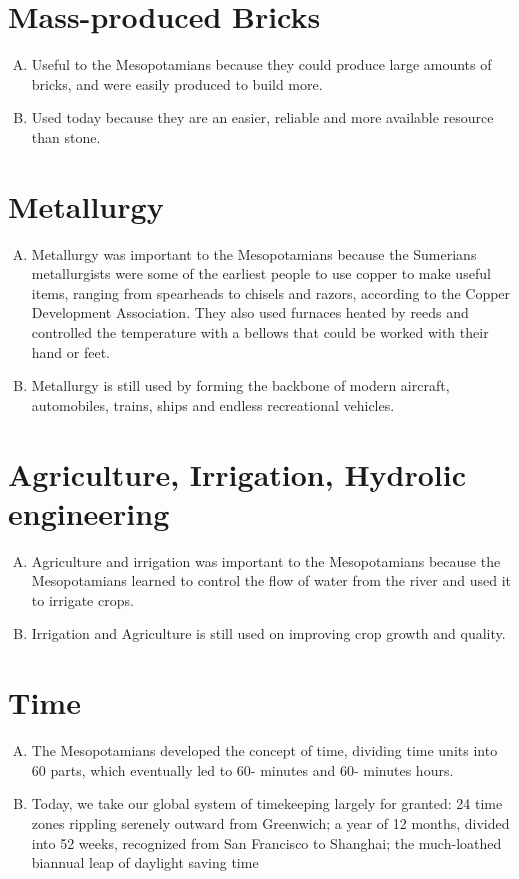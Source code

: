 \documentclass[12pt]{article}
\begin{document}
\section{Mass-produced Bricks}
\begin{enumerate}[A.]
    \item{Useful to the Mesopotamians because they could produce large amounts
        of bricks, and were easily produced to build more.}
    \item{Used today because they are an easier, reliable and more available
        resource than stone.}
\end{enumerate}

\section{Metallurgy}
\begin{enumerate}[A.]
    \item{Metallurgy was important to the Mesopotamians because the Sumerians
        metallurgists were some of the earliest people to use copper to make
        useful items, ranging from spearheads to chisels and razors, according to
        the Copper Development Association. They also used furnaces heated by reeds and
        controlled the temperature with a bellows that could be worked with their hand
        or feet.}
    \item{Metallurgy is still used by forming the backbone of modern aircraft,
        automobiles, trains, ships and endless recreational vehicles.}
\end{enumerate}

\section{Agriculture, Irrigation, Hydrolic engineering}
\begin{enumerate}[A.]
    \item{Agriculture and irrigation was important to the Mesopotamians because the
        Mesopotamians learned to control the flow of water from the river and used
        it to irrigate crops.}
    \item{Irrigation and Agriculture is still used on improving crop growth and
        quality.}
\end{enumerate}

\section{Time}
\begin{enumerate}[A.]
    \item{The Mesopotamians developed the concept of time, dividing time
        units into 60 parts, which  eventually led to 60- minutes and 60-
        minutes hours.}
    \item{Today, we take our global system of timekeeping largely for granted:
        24 time zones rippling serenely outward from Greenwich; a year of 12
        months, divided into 52 weeks, recognized from San Francisco to Shanghai;
        the much-loathed biannual leap of daylight saving time}
\end{enumerate}
\end{document}
